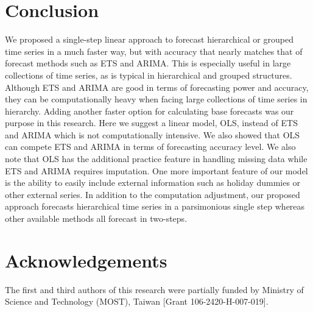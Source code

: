 \documentclass[11pt,a4paper,]{article}
\begin{document}
\section{Conclusion}\label{conclusion}

We proposed a single-step linear approach to forecast hierarchical or
grouped time series in a much faster way, but with accuracy that nearly
matches that of forecast methods such as ETS and ARIMA. This is
especially useful in large collections of time series, as is typical in
hierarchical and grouped structures. Although ETS and ARIMA are good in
terms of forecasting power and accuracy, they can be computationally
heavy when facing large collections of time series in hierarchy. Adding
another faster option for calculating base forecasts was our purpose in
this research. Here we suggest a linear model, OLS, instead of ETS and
ARIMA which is not computationally intensive. We also showed that OLS
can compete ETS and ARIMA in terms of forecasting accuracy level. We
also note that OLS has the additional practice feature in handling
missing data while ETS and ARIMA requires imputation. One more important
feature of our model is the ability to easily include external
information such as holiday dummies or other external series. In
addition to the computation adjustment, our proposed approach forecasts
hierarchical time series in a parsimonious single step whereas other
available methods all forecast in two-steps.

\section{Acknowledgements}\label{acknowledgements}

The first and third authors of this research were partially funded by
Ministry of Science and Technology (MOST), Taiwan {[}Grant
106-2420-H-007-019{]}.

\printbibliography
\end{document}
